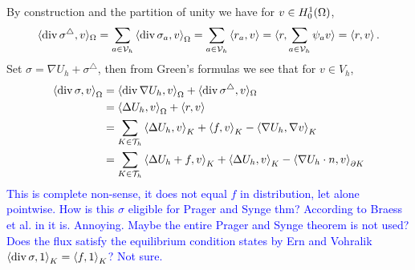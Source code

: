 \documentclass[thesis.tex]{subfiles}
\begin{document}
By construction and the partition of unity we have for $v \in H_0^1(\Omega)$,
\[
  \langle \operatorname{div} \sigma^\triangle,v\rangle_{\Omega} = \sum_{a \in \mathcal{V}_h} \left \langle \operatorname{div} \sigma_a,v \right \rangle_\Omega = \sum_{a \in \mathcal{V}_h} \left \langle r_a,v \right \rangle = \langle r, \sum_{a \in \mathcal{V}_h} \psi_a v \rangle  = \left \langle r, v \right \rangle.
\]
Set $\sigma = \nabla U_h + \sigma^\triangle$, then from Green's formulas we see that for $v \in V_h$,
\begin{align*}
  \left \langle \operatorname{div} \sigma, v \right \rangle_\Omega &=  \left \langle \operatorname{div} \nabla U_h, v \right \rangle_\Omega + \langle\operatorname{div} \sigma^\triangle, v\rangle_{\Omega}\\
  &= \left \langle \Delta U_h, v \right \rangle_\Omega + \left \langle r,v \right \rangle\\
  &= \sum_{K \in \mathcal{T}_h} \left \langle \Delta U_h,v \right \rangle_K + \left \langle f,v \right \rangle_K - \left \langle \nabla U_h, \nabla v \right \rangle_K\\
  &= \sum_{K \in \mathcal{T}_h} \left \langle \Delta U_h + f,v \right \rangle_K + \left \langle \Delta U_h, v \right \rangle_K - \left \langle \nabla U_h \cdot n, v \right \rangle_{\partial K}\\
\end{align*}
\textcolor{blue}{
  This is complete non-sense, it does not equal $f$ in distribution, let alone pointwise. How is this $\sigma$ eligible for Prager and Synge thm?  According to Braess et al. in \cite{braessequilrobust} it is. Annoying.
  Maybe the entire Prager and Synge theorem is not used? Does the flux satisfy the equilibrium condition states by Ern and Vohralik
  $\left \langle \operatorname{div} \sigma, 1 \right \rangle_K = \left \langle f, 1 \right \rangle_K$? Not sure.
}
\end{document}
